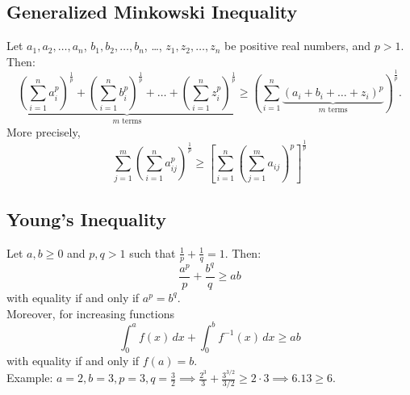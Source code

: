 \documentclass[a4paper,11pt]{article}
\begin{document}
\subsection{Generalized Minkowski Inequality}
\begin{tcolorbox}[breakable]
    Let $a_1, a_2, \dots, a_n$, $b_1, b_2, \dots, b_n$, \dots, $z_1, z_2, \dots, z_n$ be positive real numbers, and $p>1$. Then:
    \[
    \underbrace{\left(\sum_{i=1}^n a_{i}^p\right)^\frac{1}{p} + \left(\sum_{i=1}^n b_{i}^p\right)^\frac{1}{p} + \dots + \left(\sum_{i=1}^n z_{i}^p\right)^\frac{1}{p}}_{m \text{ terms}} \geq \left(\sum_{i=1}^n\underbrace{(a_{i}+b_{i}+\dots+z_{i})^p}_{m \text{ terms}}\right)^\frac{1}{p}.
    \]
    More precisely,
    \[
    \sum_{j=1}^m \left(\sum_{i=1}^n a_{ij}^p\right)^\frac{1}{p} \geq \left[\sum_{i=1}^n \left(\sum_{j=1}^m a_{ij}\right)^p \right]^\frac{1}{p}
    \]
\end{tcolorbox}


\subsection{Young's Inequality}
\begin{tcolorbox}[breakable]
    Let $a,b\geq0$ and $p,q>1$ such that $\frac{1}{p}+\frac{1}{q}=1$. Then:
    \[
    \frac{a^p}{p} + \frac{b^q}{q} \geq ab
    \]
    with equality if and only if $a^p=b^q$. \\[6pt]
    Moreover, for increasing functions
    \[
    \int_0^a f(x)\,dx + \int_0^b f^{-1}(x)\,dx \geq ab
    \]
    with equality if and only if $f(a)=b$. \\[6pt]
    Example: $\textstyle a=2,b=3,p=3,q=\frac{3}{2} \implies \frac{2^3}{3}+\frac{3^{3/2}}{3/2} \geq 2\cdot3 \implies 6.13 \geq 6.$
\end{tcolorbox}
\end{document}
